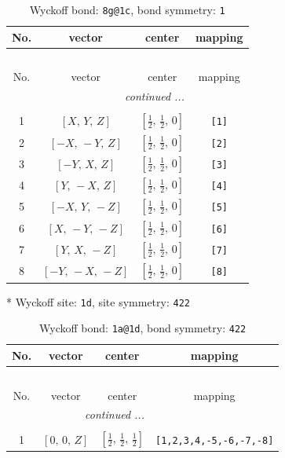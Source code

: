 \documentclass[fleqn,8pt]{jsarticle}
\begin{document}
\begin{longtable}{cccc}
\caption{Wyckoff bond: {\tt 8g@1c}, bond symmetry: {\tt 1}}
 \\
 \hline \hline
No. & vector & center & mapping \\ \hline \endfirsthead

\multicolumn{3}{l}{\tablename\ \thetable{}} \\
 \hline \hline
No. & vector & center & mapping \\ \hline \endhead

 \hline \hline
\multicolumn{3}{r}{\footnotesize\it continued ...} \\ \endfoot

 \hline \hline
\multicolumn{3}{r}{} \\ \endlastfoot

1 & $\left[ X,\, Y,\, Z \right]$ & $\left[ \frac{1}{2},\, \frac{1}{2},\, 0 \right]$ & {\tt [1]} \\ \hline
2 & $\left[ - X,\, - Y,\, Z \right]$ & $\left[ \frac{1}{2},\, \frac{1}{2},\, 0 \right]$ & {\tt [2]} \\ \hline
3 & $\left[ - Y,\, X,\, Z \right]$ & $\left[ \frac{1}{2},\, \frac{1}{2},\, 0 \right]$ & {\tt [3]} \\ \hline
4 & $\left[ Y,\, - X,\, Z \right]$ & $\left[ \frac{1}{2},\, \frac{1}{2},\, 0 \right]$ & {\tt [4]} \\ \hline
5 & $\left[ - X,\, Y,\, - Z \right]$ & $\left[ \frac{1}{2},\, \frac{1}{2},\, 0 \right]$ & {\tt [5]} \\ \hline
6 & $\left[ X,\, - Y,\, - Z \right]$ & $\left[ \frac{1}{2},\, \frac{1}{2},\, 0 \right]$ & {\tt [6]} \\ \hline
7 & $\left[ Y,\, X,\, - Z \right]$ & $\left[ \frac{1}{2},\, \frac{1}{2},\, 0 \right]$ & {\tt [7]} \\ \hline
8 & $\left[ - Y,\, - X,\, - Z \right]$ & $\left[ \frac{1}{2},\, \frac{1}{2},\, 0 \right]$ & {\tt [8]} \\
\end{longtable}
* Wyckoff site: {\tt 1d}, site symmetry: {\tt 422}
\renewcommand{\arraystretch}{1.2}
\begin{longtable}{cccc}
\caption{Wyckoff bond: {\tt 1a@1d}, bond symmetry: {\tt 422}}
 \\
 \hline \hline
No. & vector & center & mapping \\ \hline \endfirsthead

\multicolumn{3}{l}{\tablename\ \thetable{}} \\
 \hline \hline
No. & vector & center & mapping \\ \hline \endhead

 \hline \hline
\multicolumn{3}{r}{\footnotesize\it continued ...} \\ \endfoot

 \hline \hline
\multicolumn{3}{r}{} \\ \endlastfoot

1 & $\left[ 0,\, 0,\, Z \right]$ & $\left[ \frac{1}{2},\, \frac{1}{2},\, \frac{1}{2} \right]$ & {\tt [1,2,3,4,-5,-6,-7,-8]} \\
\end{longtable}
\end{document}
